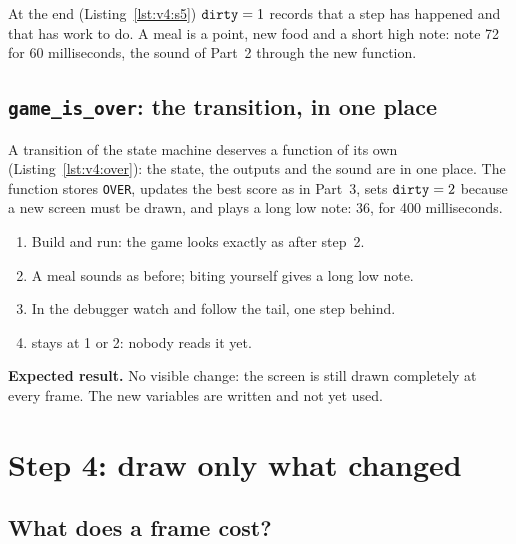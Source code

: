 

At the end (Listing~\ref{lst:v4:s5}) $\texttt{dirty}=1$ records that a step
has happened and that  has work to do. A meal is a point, new food
and a short high note: note 72 for 60 milliseconds, the sound of Part~2
through the new function.

\subsection{\texttt{game\_is\_over}: the transition, in one place}


A transition of the state machine deserves a function of its own
(Listing~\ref{lst:v4:over}): the state, the outputs and the sound are in one
place. The function stores \texttt{OVER}, updates the best score as in
Part~3, sets $\texttt{dirty}=2$ because a new screen must be drawn, and plays a
long low note: 36, for 400 milliseconds.

\begin{prgcheck}
\begin{enumerate}[nosep]
\item Build and run: the game looks exactly as after step~2.
\item A meal sounds as before; biting yourself gives a long low note.
\item In the debugger watch  and  follow the
  tail, one step behind.
\item {} stays at 1 or 2: nobody reads it yet.
\end{enumerate}
\textbf{Expected result.} No visible change: the screen is still drawn
completely at every frame. The new variables are written and not yet used.
\end{prgcheck}

\section{Step 4: draw only what changed}

\subsection{What does a frame cost?}


